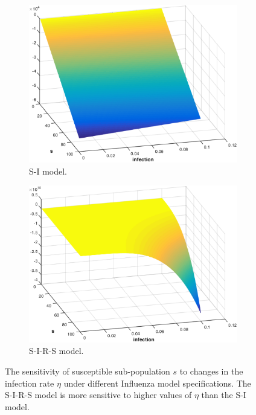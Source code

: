 \begin{figure}[t!]
    \centering
    \begin{subfigure}[b]{0.5\textwidth}    
        \centering
        \includegraphics[width=0.8\linewidth, height=0.55\linewidth]{images/sd_infection_sensitivity}
        \caption{S-I model.}
        \label{fig:influenza_sd_sensitivity}
    \end{subfigure}  
    \begin{subfigure}[b]{0.5\textwidth}    
        \centering
        \includegraphics[width=0.8\linewidth, height=0.55\linewidth]{images/sir_infection_sensitivity}
        \caption{S-I-R-S model.}
        \label{fig:influenza_sirs_sensitivity}
    \end{subfigure}  
    \caption{The sensitivity of susceptible sub-population {\footnotesize $s$} to changes in the infection rate {\footnotesize $\eta$} under different Influenza model specifications. The S-I-R-S model is more sensitive to higher values of {\footnotesize $\eta$} than the S-I model. }
    \label{fig:influenza_sensitivity}      
\end{figure}

